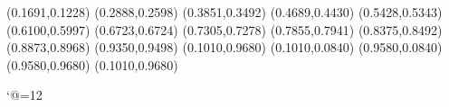 \PST@Diamond(0.1691,0.1228)
\PST@Diamond(0.2888,0.2598)
\PST@Diamond(0.3851,0.3492)
\PST@Diamond(0.4689,0.4430)
\PST@Diamond(0.5428,0.5343)
\PST@Diamond(0.6100,0.5997)
\PST@Diamond(0.6723,0.6724)
\PST@Diamond(0.7305,0.7278)
\PST@Diamond(0.7855,0.7941)
\PST@Diamond(0.8375,0.8492)
\PST@Diamond(0.8873,0.8968)
\PST@Diamond(0.9350,0.9498)
\PST@Border(0.1010,0.9680)
(0.1010,0.0840)
(0.9580,0.0840)
(0.9580,0.9680)
(0.1010,0.9680)

\catcode`@=12
\fi
\endpspicture
